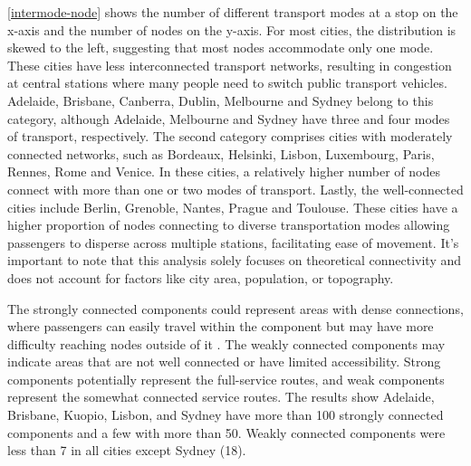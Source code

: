 \documentclass{article}
\theoremstyle{plain}
\theoremstyle{definition}
\theoremstyle{remark}
\begin{document}
\cref{intermode-node} shows the number of different transport modes at a stop on the x-axis and the number of nodes on the y-axis. For most cities, the distribution is skewed to the left, suggesting that most nodes accommodate only one mode. These cities have less interconnected transport networks, resulting in congestion at central stations where many people need to switch public transport vehicles. Adelaide, Brisbane, Canberra, Dublin, Melbourne and Sydney belong to this category, although Adelaide, Melbourne and Sydney have three and four modes of transport, respectively. The second category comprises cities with moderately connected networks, such as Bordeaux, Helsinki, Lisbon, Luxembourg, Paris, Rennes, Rome and Venice. In these cities, a relatively higher number of nodes connect with more than one or two modes of transport. Lastly, the well-connected cities include Berlin, Grenoble, Nantes, Prague and Toulouse. These cities have a higher proportion of nodes connecting to diverse transportation modes allowing passengers to disperse across multiple stations, facilitating ease of movement. It's important to note that this analysis solely focuses on theoretical connectivity and does not account for factors like city area, population, or topography.

The strongly connected components could represent areas with dense connections, where passengers can easily travel within the component but may have more difficulty reaching nodes outside of it \cite{frossard_2023b}. The weakly connected components may indicate areas that are not well connected or have limited accessibility. Strong components potentially represent the full-service routes, and weak components represent the somewhat connected service routes. The results show Adelaide, Brisbane, Kuopio, Lisbon, and Sydney have more than 100 strongly connected components and a few with more than 50. Weakly connected components were less than 7 in all cities except Sydney (18).


\end{document}
